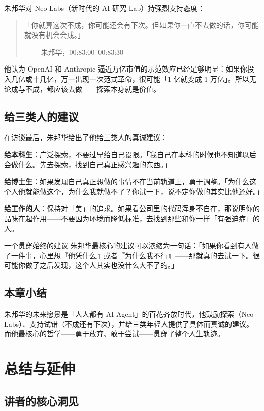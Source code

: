 \documentclass[a4paper]{article}
\begin{document}
朱邦华对 Neo-Labs（新时代的 AI 研究 Lab）持强烈支持态度：

\begin{quote}
「你就算这次不成，你可能还会有下次。但如果你一直不去做的话，你可能就没有机会会成。」\par
\hfill —— 朱邦华，00:83:00--00:83:30
\end{quote}

他认为 OpenAI 和 Anthropic 逼近万亿市值的示范效应已经足够明显：如果你投入几亿或十几亿，万一出现一次范式革命，很可能「1 亿就变成 1 万亿」。所以无论成与不成，都应该去做——探索本身就是价值。

\subsection{给三类人的建议}

在访谈最后，朱邦华给出了他给三类人的真诚建议：

\textbf{给本科生}：广泛探索，不要过早给自己设限。「我自己在本科的时候也不知道以后会做什么。先去探索，找到自己真正感兴趣的东西。」

\textbf{给博士生}：如果发现自己真正想做的事情不在当前轨道上，勇于调整。「为什么这个人他就能做这个，为什么我就做不了？你试一下，说不定你做的其实比他还好。」

\textbf{给工作的人}：保持对「美」的追求。如果看公司里的代码浑身不自在，那说明你的品味在起作用——不要因为环境而降低标准，去找到那些和你一样「有强迫症」的人。

\begin{importantbox}{一个贯穿始终的建议}
朱邦华最核心的建议可以浓缩为一句话：「如果你看到有人做了一件事，心里想『他凭什么』或者『为什么我不行』——那就真的去试一下。很可能你做了之后发现，这个人其实也没什么大不了的。」
\end{importantbox}

\subsection{本章小结}
朱邦华的未来愿景是「人人都有 AI Agent」的百花齐放时代，他鼓励探索（Neo-Labs）、支持试错（不成还有下次），并给三类年轻人提供了具体而真诚的建议。而他最核心的哲学——勇于放弃、敢于尝试——贯穿了整个人生轨迹。


\section{总结与延伸}

\subsection{讲者的核心洞见}
\end{document}
